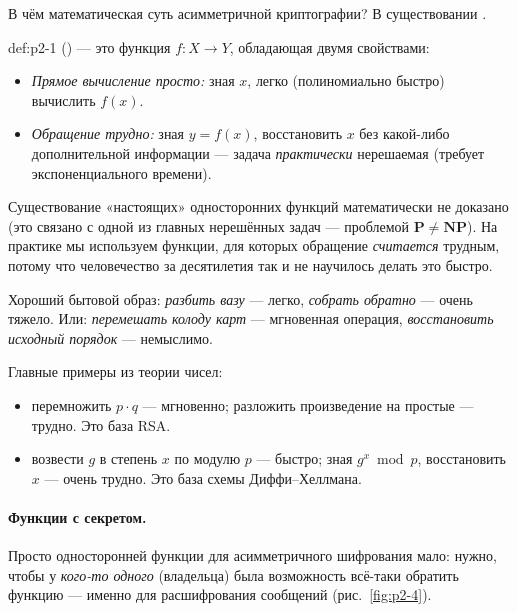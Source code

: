 В чём математическая суть асимметричной криптографии? В существовании .

\begin{definition}{}{def:p2-1}
 () --- это функция $f \colon X \to Y$, обладающая двумя свойствами:
\begin{itemize}
  \item \emph{Прямое вычисление просто:} зная $x$, легко (полиномиально быстро) вычислить $f(x)$.
  \item \emph{Обращение трудно:} зная $y = f(x)$, восстановить $x$ без какой-либо дополнительной информации --- задача \emph{практически} нерешаемая (требует экспоненциального времени).
\end{itemize}
\end{definition}

\begin{interestbox}
Существование «настоящих» односторонних функций математически не доказано (это связано с одной из главных нерешённых задач --- проблемой $\mathbf{P}\ne\mathbf{NP}$). На практике мы используем функции, для которых обращение \emph{считается} трудным, потому что человечество за десятилетия так и не научилось делать это быстро.
\end{interestbox}

Хороший бытовой образ: \emph{разбить вазу} --- легко, \emph{собрать обратно} --- очень тяжело. Или: \emph{перемешать колоду карт} --- мгновенная операция, \emph{восстановить исходный порядок} --- немыслимо.

Главные примеры из теории чисел:
\begin{itemize}
  \item {} перемножить $p\cdot q$ --- мгновенно; разложить произведение на простые --- трудно. Это база RSA.
  \item {} возвести $g$ в степень $x$ по модулю $p$ --- быстро; зная $g^x \bmod p$, восстановить $x$ --- очень трудно. Это база схемы Диффи--Хеллмана.
\end{itemize}

\paragraph*{Функции с секретом.} Просто односторонней функции для асимметричного шифрования мало: нужно, чтобы у \emph{кого-то одного} (владельца) была возможность всё-таки обратить функцию --- именно для расшифрования сообщений (рис.~\ref{fig:p2-4}).

